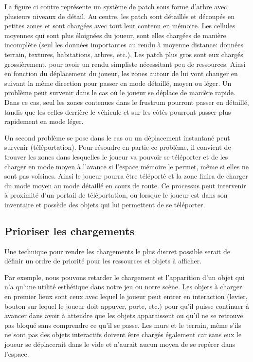 \documentclass[a4paper, 12pt]{article} %
\begin{document}
La figure ci contre représente un système de patch sous forme d'arbre avec plusieurs niveaux de détail. Au centre, les patch sont détaillés et découpés en petites zones et sont chargées avec tout leur contenu en mémoire. Les cellules moyennes qui sont plus éloignées du joueur, sont elles chargées de manière incomplète (seul les données importantes au rendu à moyenne distance: données terrain, textures, habitations, arbres, etc.). Les patch plus gros sont eux chargés grossièrement, pour avoir un rendu simpliste nécessitant peu de ressources. Ainsi en fonction du déplacement du joueur, les zones autour de lui vont changer en suivant la même direction pour passer en mode détaillé, moyen ou léger. Un problème peut survenir dans le cas où le joueur se déplace de manière rapide. Dans ce cas, seul les zones contenues dans le frustrum pourront passer en détaillé, tandis que les celles derrière le véhicule et sur les côtés pourront passer plus rapidement en mode léger.

Un second problème se pose dans le cas ou un déplacement instantané peut survenir (téléportation). Pour résoudre en partie ce problème, il convient de trouver les zones dans lesquelles le joueur va pouvoir se téléporter et de les charger en mode moyen à l'avance si l'espace mémoire le permet, même si elles ne sont pas voisines. Ainsi le joueur pourra être téléporté et la zone finira de charger du mode moyen au mode détaillé en cours de route. Ce processus peut intervenir à proximité d'un portail de téléportation, ou lorsque le joueur est dans son inventaire et possède des objets qui lui permettent de se téléporter.

\subsection{Prioriser les chargements}
Une technique pour rendre les chargements le plus discret possible serait de définir un ordre de priorité pour les ressources et objets à afficher. 

Par exemple, nous pouvons retarder le chargement et l'apparition d'un objet qui n'a qu'une utilité esthétique dans notre jeu ou notre scène. Les objets à charger en premier lieux sont ceux avec lequel le joueur peut entrer en interaction (levier, bouton sur lequel le joueur doit appuyer, porte, etc.) pour qu'il puisse continuer à avancer dans avoir à attendre que les objets apparaissent ou qu'il ne se retrouve pas bloqué sans comprendre ce qu'il se passe. Les murs et le terrain, même s'ils ne sont pas des objets interactifs doivent être chargés également car sans eux le joueur se déplacerait dans le vide et n'aurait aucun moyen de se repérer dans l'espace.
\end{document}

